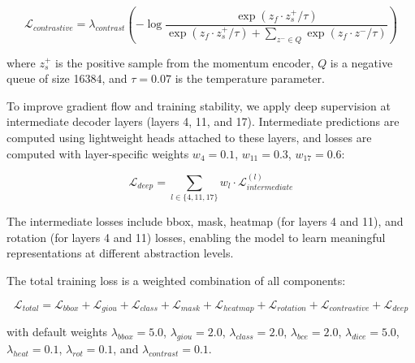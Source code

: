 \begin{equation}
\mathcal{L}_{contrastive} = \lambda_{contrast} \left(-\log \frac{\exp(z_f \cdot z_s^+ / \tau)}{\exp(z_f \cdot z_s^+ / \tau) + \sum_{z^- \in Q} \exp(z_f \cdot z^- / \tau)}\right)
\end{equation}

where $z_s^+$ is the positive sample from the momentum encoder, $Q$ is a negative queue of size 16384, and $\tau = 0.07$ is the temperature parameter.

To improve gradient flow and training stability, we apply deep supervision at intermediate decoder layers (layers 4, 11, and 17). Intermediate predictions are computed using lightweight heads attached to these layers, and losses are computed with layer-specific weights $w_4 = 0.1$, $w_{11} = 0.3$, $w_{17} = 0.6$:

\begin{equation}
\mathcal{L}_{deep} = \sum_{l \in \{4, 11, 17\}} w_l \cdot \mathcal{L}_{intermediate}^{(l)}
\end{equation}

The intermediate losses include bbox, mask, heatmap (for layers 4 and 11), and rotation (for layers 4 and 11) losses, enabling the model to learn meaningful representations at different abstraction levels.

The total training loss is a weighted combination of all components:

\begin{equation}
\mathcal{L}_{total} = \mathcal{L}_{bbox} + \mathcal{L}_{giou} + \mathcal{L}_{class} + \mathcal{L}_{mask} + \mathcal{L}_{heatmap} + \mathcal{L}_{rotation} + \mathcal{L}_{contrastive} + \mathcal{L}_{deep}
\end{equation}

with default weights $\lambda_{bbox} = 5.0$, $\lambda_{giou} = 2.0$, $\lambda_{class} = 2.0$, $\lambda_{bce} = 2.0$, $\lambda_{dice} = 5.0$, $\lambda_{heat} = 0.1$, $\lambda_{rot} = 0.1$, and $\lambda_{contrast} = 0.1$.
